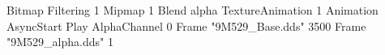 {Bitmap
  {Filtering 1}
  {Mipmap 1}
  {Blend alpha}
  {TextureAnimation 1}
  {Animation AsyncStart Play}
  {AlphaChannel 0}
  {Frame "9M529_Base.dds" 3500}
  {Frame "9M529_alpha.dds" 1}
}
